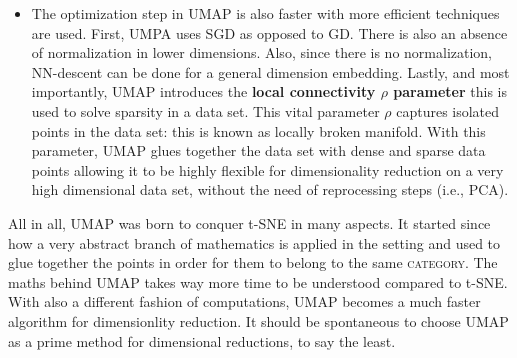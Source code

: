 \documentclass[a4paper, 11pt]{article}
\begin{document}
\begin{itemize}
\begin{itemize}
\item The optimization step in UMAP is also faster with more efficient  techniques are used. First, UMPA uses SGD as opposed to GD. There is also an absence of normalization in lower dimensions. Also, since there is no normalization, NN-descent can be done for a general dimension embedding. Lastly, and most importantly, UMAP introduces the \textbf{local connectivity $\rho$ parameter} this is used to solve sparsity in a data set. This vital parameter \textsc{$\rho$} captures isolated points in the data set: this is known as locally broken manifold. With this parameter, UMAP glues together the data set with dense and sparse data points allowing it to be highly flexible for dimensionality reduction on a very high dimensional data set, without the need of reprocessing steps (i.e., PCA). 
\end{itemize}

All in all, UMAP was born to conquer t-SNE in many aspects. It started since how a very abstract branch of mathematics is applied in the setting and used to glue together the points in order for them to belong to the same \textsc{category}.  The maths behind UMAP takes way more time to be understood compared to t-SNE. With also a different fashion of computations, UMAP becomes a much faster algorithm for dimensionlity reduction. It should be spontaneous to choose UMAP as a prime method for dimensional reductions, to say the least.  
\end{itemize}
\end{document}
